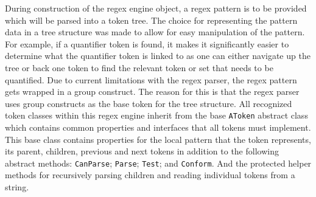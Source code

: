 During construction of the regex engine object, a regex pattern is to be provided which will be parsed into a token tree. The choice for representing the pattern data in a tree structure was made to allow for easy manipulation of the pattern. For example, if a quantifier token is found, it makes it significantly easier to determine what the quantifier token is linked to as one can either navigate up the tree or back one token to find the relevant token or set that needs to be quantified.
Due to current limitations with the regex parser, the regex pattern gets wrapped in a group construct. The reason for this is that the regex parser uses group constructs as the base token for the tree structure. All recognized token classes within this regex engine inherit from the base \texttt{AToken} abstract class which contains common properties and interfaces that all tokens must implement. This base class contains properties for the local pattern that the token represents, its parent, children, previous and next tokens in addition to the following abstract methods: \texttt{CanParse}; \texttt{Parse}; \texttt{Test}; and \texttt{Conform}. And the protected helper methods for recursively parsing children and reading individual tokens from a string.

